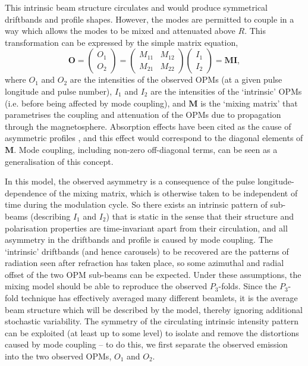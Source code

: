 This intrinsic beam structure circulates and would produce symmetrical driftbands and profile shapes. However, the modes are permitted to couple in a way which allows the modes to be mixed and attenuated above $R$. This transformation can be expressed by the simple matrix equation,
\begin{equation}
\label{eq: definition of the mixing matrix}
    \mathbf{O} = \begin{pmatrix} O_1\\O_2 \end{pmatrix} = \begin{pmatrix} M_{11} & M_{12}\\M_{21} & M_{22} \end{pmatrix} \begin{pmatrix} I_1\\I_2 \end{pmatrix} = \mathbf{MI},
\end{equation}
where $O_1$ and $O_2$ are the intensities of the observed OPMs (at a given pulse longitude and pulse number), $I_1$ and $I_2$ are the intensities of the `intrinsic' OPMs (i.e. before being affected by mode coupling), and $\mathbf{M}$ is the `mixing matrix' that parametrises the coupling and attenuation of the OPMs due to propagation through the magnetosphere. Absorption effects have been cited as the cause of asymmetric profiles \citep[e.g.][]{Rxxx1983b}, and this effect would correspond to the diagonal elements of $\mathbf{M}$. Mode coupling, including non-zero off-diagonal terms, can be seen as a generalisation of this concept.

In this model, the observed asymmetry is a consequence of the pulse longitude-dependence of the mixing matrix, which is otherwise taken to be independent of time during the modulation cycle. So there exists an intrinsic pattern of sub-beams (describing $I_1$ and $I_2$) that is static in the sense that their structure and polarisation properties are time-invariant apart from their circulation, and all asymmetry in the driftbands and profile is caused by mode coupling. The `intrinsic' driftbands (and hence carousels) to be recovered are the patterns of radiation seen after refraction has taken place, so some azimuthal and radial offset of the two OPM sub-beams can be expected. Under these assumptions, the mixing model should be able to reproduce the observed $P_3$-folds. Since the $P_3$-fold technique has effectively averaged many different beamlets, it is the average beam structure which will be described by the model, thereby ignoring additional stochastic variability. The symmetry of the circulating intrinsic intensity pattern can be exploited (at least up to some level) to isolate and remove the distortions caused by mode coupling -- to do this, we first separate the observed emission into the two observed OPMs, $O_1$ and $O_2$.

